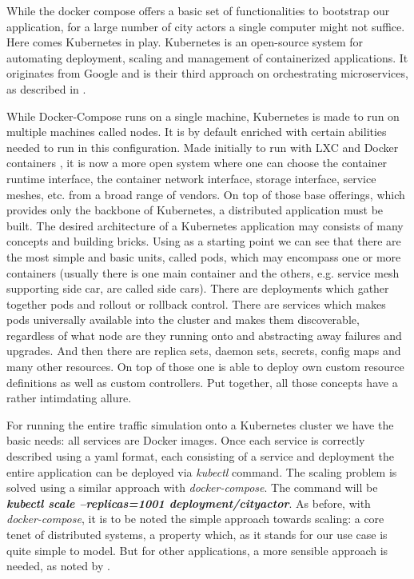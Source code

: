 \documentclass[conference]{IEEEtran}
\begin{document}
While the docker compose offers a basic set of functionalities to bootstrap our application, for a large number of city actors a single computer might not suffice. Here comes Kubernetes in play. Kubernetes \cite{Kubernetes} is an open-source system for automating deployment, scaling and management of containerized applications. It originates from Google and is their third approach on orchestrating microservices, as described in \cite{burns2016borg}.

While Docker-Compose runs on a single machine, Kubernetes is made to run on multiple machines called nodes. It is by default enriched with certain abilities needed to run in this configuration. Made initially to run with LXC and Docker containers \cite{7036275}, it is now a more open system where one can choose the container runtime interface, the container network interface, storage interface, service meshes, etc. from a broad range of vendors. On top of those base offerings, which provides only the backbone of Kubernetes, a distributed application must be built. The desired architecture of a Kubernetes application may consists of many concepts and building bricks. Using \cite{hightower2017kubernetes} as a starting point we can see that there are the most simple and basic units, called pods, which may encompass one or more containers (usually there is one main container and the others, e.g. service mesh supporting side car, are called side cars). There are deployments which gather together pods and rollout or rollback control. There are services which makes pods universally available into the cluster and makes them discoverable, regardless of what node are they running onto and abstracting away failures and upgrades. And then there are replica sets, daemon sets, secrets, config maps and many other resources. On top of those one is able to deploy own custom resource definitions as well as custom controllers. Put together, all those concepts have a rather intimdating allure.

For running the entire traffic simulation onto a Kubernetes cluster we have the basic needs: all services are Docker images. Once each service is correctly described using a yaml format, each consisting of a service and deployment the entire application can be deployed via \textit{kubectl} command. The scaling problem is solved using a similar approach with \textit{docker-compose}. The command will be \textit{\textbf{kubectl scale --replicas=1001 deployment/cityactor}}. As before, with \textit{docker-compose}, it is to be noted the simple approach towards scaling: a core tenet of distributed systems, a property which, as it stands for our use case is quite simple to model. But for other applications, a more sensible approach is needed, as noted by \cite{jogalekar2000evaluating}.
\end{document}
